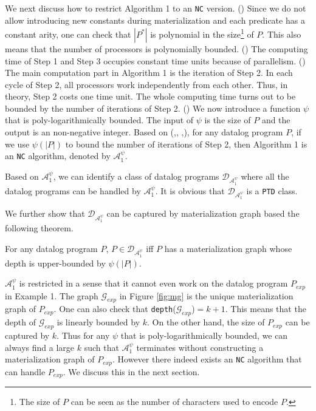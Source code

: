 \documentclass{article}
\begin{document}
We next discuss how to restrict Algorithm 1 to an \texttt{NC} version. (\uppercase\expandafter{}) Since we do not allow introducing new constants during materialization and each predicate has a constant arity, one can check that $|P^*|$ is polynomial in the size\footnote{The size of $P$ can be seen as the number of characters used to encode $P$.} of $P$. This also means that the number of processors is polynomially bounded. (\uppercase\expandafter{}) The computing time of Step 1 and Step 3 occupies constant time units because of parallelism. (\uppercase\expandafter{}) The main computation part in Algorithm 1 is the iteration of Step 2. In each cycle of Step 2, all processors work independently from each other. Thus, in theory, Step 2 costs one time unit. The whole computing time turns out to be bounded by the number of iterations of Step 2. (\uppercase\expandafter{})
We now introduce a function $\psi$ that is poly-logarithmically bounded.  The input of $\psi$ is the size of $P$ and the output is an non-negative integer. Based on (\uppercase\expandafter{},\uppercase\expandafter{},
\uppercase\expandafter{},\uppercase\expandafter{}), for any datalog program $P$, if we use $\psi(|P|)$ to
bound the number of iterations of Step 2, then Algorithm 1 is an \texttt{NC} algorithm, denoted by $\mathcal{A}_1^{\psi}$.

Based on $\mathcal{A}_1^{\psi}$, we can identify a class of datalog programs $\mathcal{D}_{\mathcal{A}_1^{\psi}}$ where all the datalog programs can be handled by $\mathcal{A}_1^{\psi}$. It is obvious that $\mathcal{D}_{\mathcal{A}_1^{\psi}}$ is a \texttt{PTD} class.

We further show that $\mathcal{D}_{\mathcal{A}_1^{\psi}}$ can be captured by materialization graph based the following theorem.

\begin{theorem}
For any datalog program $P$, $P\in\mathcal{D}_{\mathcal{A}_1^{\psi}}$ iff $P$ has a materialization graph whose depth is upper-bounded by $\psi(|P|)$.
\end{theorem}

$\mathcal{A}_1^{\psi}$ is restricted in a sense that it cannot even work on the datalog program $P_{exp}$ in Example 1. The graph $\mathcal{G}_{exp}$ in Figure \ref{fig:mg} is the unique materialization graph of $P_{exp}$. One can also check that \texttt{depth}($\mathcal{G}_{exp}$)$=k+1$. This means that the depth of $\mathcal{G}_{exp}$ is linearly bounded by $k$. On the other hand, the size of $P_{exp}$ can be captured by $k$. Thus for any $\psi$ that is poly-logarithmically bounded, we can always find a large $k$ such that $\mathcal{A}_1^{\psi}$ terminates without constructing a materialization graph of $P_{exp}$. However there indeed exists an \texttt{NC} algorithm that can handle $P_{exp}$. We discuss this in the next section.
\end{document}
